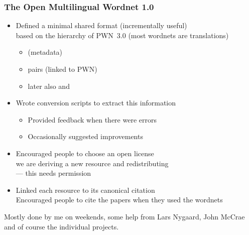 \documentclass{beamer}
\begin{document}
\begin{frame}{}
\frametitle{The Open Multilingual Wordnet 1.0}
\begin{itemize}
\item Defined a minimal shared format (incrementally useful)
  \\ based on the hierarchy of PWN~3.0 (most wordnets are translations)
  \begin{itemize}
  \item {} (metadata)
  \item {} pairs (linked to PWN)
  \item later also  and  
  \end{itemize}
\item Wrote conversion scripts to extract this information
  \begin{itemize}
  \item Provided feedback when there were errors
  \item Occasionally suggested improvements
  \end{itemize}
\item Encouraged people to choose an open license 
  \\ we are deriving a   new resource and redistributing 
  \\ --- this needs permission
\item Linked each resource to its canonical citation
  \\ Encouraged people to cite the papers when they used the wordnets
\end{itemize}
Mostly done by me on weekends, some help from Lars Nygaard, John McCrae and of course the individual projects.
\end{frame}
\end{document}
